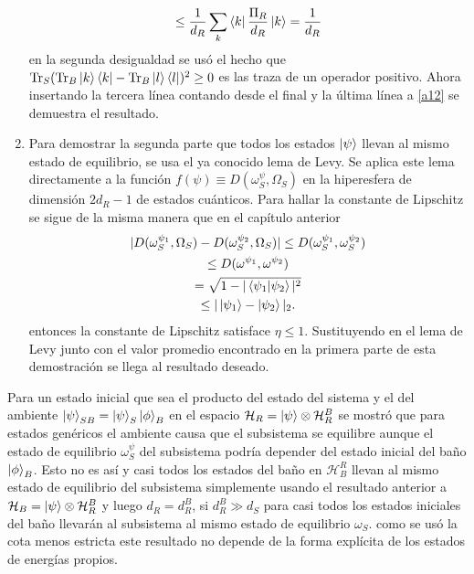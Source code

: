 \begin{enumerate}
\begin{multline}
\leq \frac{1}{d_{R}} \sum_{k} \bra{k} \frac{\Pi_{R}}{d_{R}} \ket{k} = \frac{1}{d_{R}}
\end{multline}
en la segunda desigualdad se usó el hecho que $\Tr_{S} (\Tr_{B} \ket{k}\bra{k}-\Tr_{B} \ket{l}\bra{l})^{2}\geq 0$ es las traza de un operador positivo. Ahora insertando la tercera línea contando desde el final y la última línea a \ref{a12} se demuestra el resultado.
\item Para demostrar la segunda parte que todos los estados $\ket{\psi}$ llevan al mismo estado de equilibrio, se usa el ya conocido lema de Levy. Se aplica este lema directamente a la función $f(\psi) \equiv D(\omega_{S}^{\psi}, \Omega_{S})$ en la hiperesfera de dimensión $2d_{R}-1$ de estados cuánticos. Para hallar la constante de Lipschitz se sigue de la misma manera que en el capítulo anterior
\begin{multline}
|D(\omega_{S}^{\psi_{1}}, \Omega_{S})-D(\omega_{S}^{\psi_{2}},\Omega_{S})| \leq D(\omega_{S}^{\psi_{1}},\omega_{S}^{\psi_{2}})
\\
\leq D(\omega^{\psi_{1}},\omega^{\psi_{2}})
\\
= \sqrt{1- |\bra{\psi_{1}} \ket{\psi_{2}}|^{2}}
\\
\leq |\ket{\psi_{1}} - \ket{\psi_{2}}|_{2}.
\end{multline} 
entonces la constante de Lipschitz satisface $\eta \leq 1$. Sustituyendo en el lema de Levy junto con el valor promedio encontrado en la primera parte de esta demostración se llega al resultado deseado.
\\
\end{enumerate}

Para un estado inicial que sea el producto del estado del sistema y el del ambiente $\ket{\psi}_{SB}= \ket{\psi}_{S} \ket{\phi}_{B}$ en el espacio $\mathcal{H}_{R}=\ket{\psi} \otimes \mathcal{H}_{R}^{B}$ se mostró que para estados genéricos el ambiente causa que el subsistema se equilibre aunque el estado de equilibrio $\omega_{S}^{\psi}$ del subsistema podría  depender del estado inicial del baño $\ket{\phi}_{B}$. Esto no es así y casi todos los estados del baño en $\mathcal{H}_{B}^{R}$ llevan al mismo estado de equilibrio del subsistema simplemente usando el resultado anterior a  $\mathcal{H}_{B} = \ket{\psi}\otimes \mathcal{H}_{R}^{B}$ y luego $d_{R} = d_{R}^{B}$, si $d_{R}^{B} \gg d_{S}$ para casi todos los estados iniciales del baño llevarán al subsistema al mismo estado de equilibrio $\omega_{S}$. como se usó la cota menos estricta este resultado no depende de la forma explícita de los estados de energías propios.
\\


